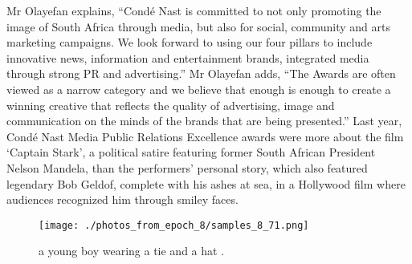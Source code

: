 \documentclass{article}%
\begin{document}
Mr Olayefan explains, “Condé Nast is committed to not only promoting the image of South Africa through media, but also for social, community and arts marketing campaigns. We look forward to using our four pillars to include innovative news, information and entertainment brands, integrated media through strong PR and advertising.”\newline%
Mr Olayefan adds, “The Awards are often viewed as a narrow category and we believe that enough is enough to create a winning creative that reflects the quality of advertising, image and communication on the minds of the brands that are being presented.”\newline%
Last year, Condé Nast Media Public Relations Excellence awards were more about the film ‘Captain Stark’, a political satire featuring former South African President Nelson Mandela, than the performers’ personal story, which also featured legendary Bob Geldof, complete with his ashes at sea, in a Hollywood film where audiences recognized him through smiley faces.\newline%

%


\begin{figure}[h!]%
\centering%
\texttt{[image: ./photos\_from\_epoch\_8/samples\_8\_71.png]}%
\caption{a young boy wearing a tie and a hat .}%
\end{figure}

%
\end{document}
